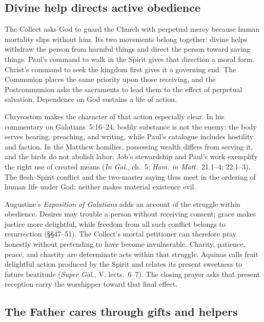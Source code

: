 \subsection*{Divine help directs active obedience\enspace{}}

The Collect asks God to guard the Church with perpetual mercy because human
mortality slips without him. Its two movements belong together: divine helps
withdraw the person from harmful things and direct the person toward saving
things. Paul's command to walk in the Spirit gives that direction a moral
form. Christ's command to seek the kingdom first gives it a governing end.
The Communion places the same priority upon those receiving, and the
Postcommunion asks the sacraments to lead them to the effect of perpetual
salvation. Dependence on God sustains a life of action.

Chrysostom makes the character of that action especially clear. In his
commentary on Galatians~5:16--24, bodily substance is not the enemy: the body
serves hearing, preaching, and writing, while Paul's catalogue includes
hostility and faction. In the Matthew homilies, possessing wealth differs
from serving it, and the birds do not abolish labor. Job's stewardship and
Paul's work exemplify the right use of created means (\emph{In Gal.}, ch.~5;
\emph{Hom. in Matt.}~21.1--4; 22.1--3). The flesh--Spirit conflict and the
two-master saying thus meet in the ordering of human life under God; neither
makes material existence evil.

Augustine's \emph{Exposition of Galatians} adds an account of the struggle
within obedience. Desires may trouble a person without receiving consent;
grace makes justice more delightful, while freedom from all such conflict
belongs to resurrection (§§47--51). The Collect's mortal petitioner can
therefore pray honestly without pretending to have become invulnerable.
Charity, patience, peace, and chastity are determinate acts within that
struggle. Aquinas calls fruit delightful action produced by the Spirit and
relates its present sweetness to future beatitude (\emph{Super Gal.}, V,
lects.~6--7). The closing prayer asks that present reception carry the
worshipper toward that final effect.

\subsection*{The Father cares through gifts and helpers\enspace{}}

